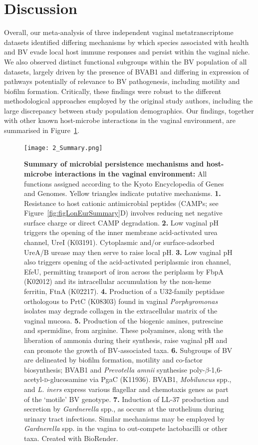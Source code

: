 \documentclass[sn-mathphys,Numbered]{sn-jnl}%
\begin{document}
\section{Discussion}\label{sec:secDisc}

Overall, our meta-analysis of three independent vaginal metatranscriptome datasets identified differing mechanisms by which species associated with health and BV evade local host immune responses and persist within the vaginal niche. We also observed distinct functional subgroups within the BV population of all datasets, largely driven by the presence of BVAB1 and differing in expression of pathways potentially of relevance to BV pathogenesis, including motility and biofilm formation. Critically, these findings were robust to the different methodological approaches employed by the original study authors, including the large discrepancy between study population demographics. Our findings, together with other known host-microbe interactions in the vaginal environment, are summarised in Figure~\ref{fig:figMechSummary}.

\begin{figure}[h]
\centering
\texttt{[image: 2\_Summary.png]}
\caption{\textbf{Summary of microbial persistence mechanisms and host-microbe interactions in the vaginal environment:} All functions assigned according to the Kyoto Encyclopedia of Genes and Genomes. Yellow triangles indicate putative mechanisms. \textbf{1.} Resistance to host cationic antimicrobial peptides (CAMPs; see Figure~\ref{fig:figLonEurSummary}D) involves reducing net negative surface charge or direct CAMP degradation. \textbf{2.} Low vaginal pH triggers the opening of the inner membrane acid-activated urea channel, UreI (K03191). Cytoplasmic and/or surface-adsorbed UreA/B urease may then serve to raise local pH. \textbf{3.} Low vaginal pH also triggers opening of the acid-activated periplasmic iron channel, EfeU, permitting transport of iron across the periplasm by FbpA (K02012) and its intracellular accumulation by the non-heme ferritin, FtnA (K02217). \textbf{4.} Production of a U32-family peptidase orthologous to PrtC (K08303) found in vaginal \textit{Porphyromonas} isolates may degrade collagen in the extracellular matrix of the vaginal mucosa. \textbf{5.} Production of the biogenic amines, putrescine and spermidine, from arginine. These polyamines, along with the liberation of ammonia during their synthesis, raise vaginal pH and can promote the growth of BV-associated taxa. \textbf{6.} Subgroups of BV are delineated by biofilm formation, motility and co-factor biosynthesis; BVAB1 and \textit{Prevotella amnii} synthesise poly-$\beta$-1,6-acetyl-\textsc{d}-glucosamine via PgaC (K11936). BVAB1, \textit{Mobiluncus} spp., and \textit{L. iners} express various flagellar and chemotaxis genes as part of the `motile' BV genotype. \textbf{7.} Induction of LL-37 production and secretion by \textit{Gardnerella} spp., as occurs at the urothelium during urinary tract infections. Similar mechanisms may be employed by \textit{Gardnerella} spp. in the vagina to out-compete lactobacilli or other taxa. Created with BioRender.}\label{fig:figMechSummary}
\end{figure}
\end{document}
